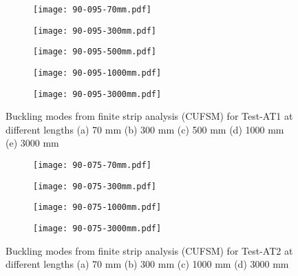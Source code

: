 \begin{figure}
	\centering
	\begin{subfigure}[b]{0.15\textwidth}
		\centering
		\texttt{[image: 90-095-70mm.pdf]}
		\caption{}
		\label{subfig:90-095-70mm}
	\end{subfigure}
	\begin{subfigure}[b]{0.15\textwidth}
		\centering
		\texttt{[image: 90-095-300mm.pdf]}
		\caption{}
		\label{subfig:90-095-300mm}
	\end{subfigure}
	\begin{subfigure}[b]{0.15\textwidth}
		\centering
		\texttt{[image: 90-095-500mm.pdf]}
		\caption{}
		\label{subfig:90-095-500mm}
	\end{subfigure}
	\begin{subfigure}[b]{0.18\textwidth}
		\centering
		\texttt{[image: 90-095-1000mm.pdf]}
		\caption{}
		\label{subfig:90-095-1000mm}
	\end{subfigure}
	\begin{subfigure}[b]{0.18\textwidth}
		\centering
		\texttt{[image: 90-095-3000mm.pdf]}
		\caption{}
		\label{subfig:90-095-3000mm}
	\end{subfigure}
		\caption{Buckling modes from finite strip analysis (CUFSM) for Test-AT1 at different lengths (a) 70 mm (b) 300 mm (c) 500 mm (d) 1000 mm (e) 3000 mm}
		\label{fig:90-095-CUFSM-buckling}
\end{figure}
\begin{figure}
	\centering
	\begin{subfigure}[b]{0.15\textwidth}
		\centering
		\texttt{[image: 90-075-70mm.pdf]}
		\caption{}
		\label{subfig:90-075-70mm}
	\end{subfigure}
	\begin{subfigure}[b]{0.18\textwidth}
		\centering
		\texttt{[image: 90-075-300mm.pdf]}
		\caption{}
		\label{subfig:90-075-300mm}
	\end{subfigure}
	\begin{subfigure}[b]{0.18\textwidth}
		\centering
		\texttt{[image: 90-075-1000mm.pdf]}
		\caption{}
		\label{subfig:90-075-1000mm}
	\end{subfigure}
	\begin{subfigure}[b]{0.18\textwidth}
		\centering
		\texttt{[image: 90-075-3000mm.pdf]}
		\caption{}
		\label{subfig:90-075-3000mm}
	\end{subfigure}
		\caption{Buckling modes from finite strip analysis (CUFSM) for Test-AT2 at different lengths (a) 70 mm (b) 300 mm (c) 1000 mm (d) 3000 mm}
		\label{fig:90-075-CUFSM-buckling}
\end{figure}
